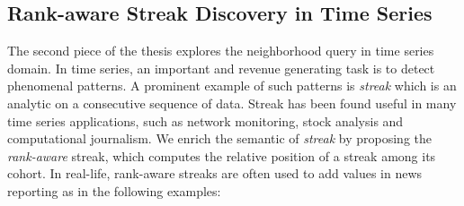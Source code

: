 \subsection{Rank-aware Streak Discovery in Time Series}
The second piece of the thesis explores the neighborhood
query in time series domain. In time series, an important
and revenue generating task is to detect phenomenal patterns.
A prominent example of such patterns is \emph{streak} which is
an analytic on a consecutive sequence of data. Streak has been
found useful in many time series applications,
such as network monitoring, stock analysis
and computational journalism.  We enrich the semantic of \emph{streak}
by proposing the \emph{rank-aware} streak, which computes the
relative position of a streak among its cohort. In real-life,
rank-aware streaks are often used to add values in news reporting as 
in the following examples:


